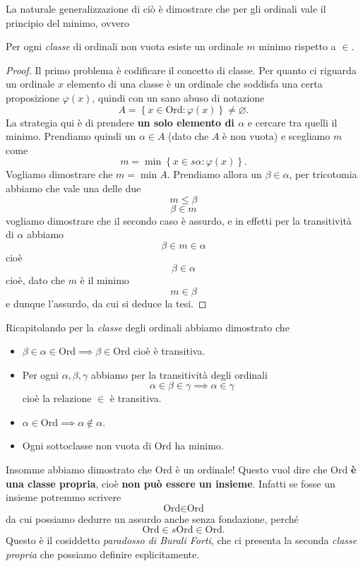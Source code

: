 \documentclass[11pt]{scrartcl}
\newcommand{\eset}{\varnothing}
\begin{document}
 	La naturale generalizzazione di ciò è dimostrare che per gli ordinali vale il principio del minimo, ovvero
 	\begin{theorem}
 		Per ogni \textit{classe} di ordinali non vuota esiste un ordinale $m$ minimo rispetto a $\in$.
 	\end{theorem}
 	\begin{proof}
 		Il primo problema è codificare il concetto di classe. Per quanto ci riguarda un ordinale $x$ elemento di una classe è un ordinale che soddisfa una certa proposizione $\varphi(x)$, quindi con un sano abuso di notazione
 		$$A=\left\{x\in\text{Ord}:\varphi(x)\right\}\ne \eset.$$
 		La strategia qui è di prendere \textbf{un solo elemento di $\alpha$} e cercare tra quelli il minimo. Prendiamo quindi un $\alpha\in A$ (dato che $A$ è non vuota) e scegliamo $m$ come
 		$$m=\min\left\{x\in s\alpha:\varphi(x)\right\}.$$
 		Vogliamo dimostrare che $m=\min A$. Prendiamo allora un $\beta\in \alpha$, per tricotomia abbiamo che vale una delle due
 		$$m\le \beta$$
 		$$\beta\in m$$
 		vogliamo dimostrare che il secondo caso è assurdo, e in effetti per la transitività di $\alpha$ abbiamo
 		$$\beta\in m \in \alpha$$
 		cioè 
 		$$\beta\in \alpha$$
 		cioè, dato che $m$ è il minimo 
 		$$m\in \beta$$
 		e dunque l'assurdo, da cui si deduce la tesi.
 	\end{proof}
 	Ricapitolando per la \textit{classe} degli ordinali abbiamo dimostrato che
 	\begin{itemize}
 		\item $\beta\in \alpha\in \text{Ord} \implies \beta\in \text{Ord}$ cioè è transitiva.
 		\item Per ogni $\alpha,\beta,\gamma$ abbiamo per la transitività degli ordinali
 		$$\alpha\in\beta\in \gamma \implies \alpha \in \gamma$$
 		cioè la relazione $\in $ è transitiva.
 		\item  $\alpha\in \text{Ord} \implies \alpha\not\in\alpha$.
 		\item Ogni sottoclasse non vuota di $\text{Ord}$ ha minimo.
 	\end{itemize}
 	Insomme abbiamo dimostrato che $\text{Ord}$ è un ordinale! Questo vuol dire che $\text{Ord}$ \textbf{è una classe propria}, cioè \textbf{non può essere un insieme}. Infatti se fosse un insieme potremmo scrivere
 	$$\text{Ord}\in \text{Ord}$$
 	da cui possiamo dedurre un assurdo anche senza fondazione, perché
 	$$\text{Ord}\in s\text{Ord}\in \text{Ord}.$$
 	Questo è il cosiddetto \textit{paradosso di Burali Forti}, che ci presenta la seconda \textit{classe propria} che possiamo definire esplicitamente.
\end{document}

